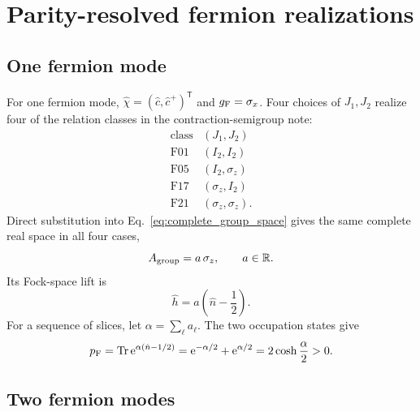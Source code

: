 \documentclass[onecolumn,aps,prb,amsmath,amssymb,superscriptaddress,longbibliography]{revtex4-2}
\newcommand{\Tr}{\operatorname{Tr}}
\newcommand{\ee}{\mathrm{e}}
\newcommand{\trans}{\mathsf{T}}
\begin{document}
\section{Parity-resolved fermion realizations}

\subsection{One fermion mode}

For one fermion mode,
\(\hat\chi=(\hat c,\hat c^+)^\trans\) and \(g_{\rm F}=\sigma_x\).
Four choices of \(J_1,J_2\) realize four of the relation classes in the
contraction-semigroup note:
\begin{equation}
\begin{array}{c|c}
\text{class} & (J_1,J_2) \\ \hline
\mathrm{F01} & (I_2,I_2)\\
\mathrm{F05} & (I_2,\sigma_z)\\
\mathrm{F17} & (\sigma_z,I_2)\\
\mathrm{F21} & (\sigma_z,\sigma_z).
\end{array}
    \label{eq:one_mode_realizations}
\end{equation}
Direct substitution into Eq.~\eqref{eq:complete_group_space} gives the same
complete real space in all four cases,
\begin{equation}
    A_{\rm group}=a\,\sigma_z,\qquad a\in\mathbb R .
    \label{eq:one_mode_group}
\end{equation}
Its Fock-space lift is
\begin{equation}
    \hat h=a\left(\hat n-\frac12\right).
    \label{eq:one_mode_fermion_generator}
\end{equation}
For a sequence of slices, let \(\alpha=\sum_\ell a_\ell\).  The two occupation
states give
\begin{equation}
    p_{\rm F}
    =\Tr\ee^{\alpha(\hat n-1/2)}
    =\ee^{-\alpha/2}+\ee^{\alpha/2}
    =2\cosh\frac{\alpha}{2}>0 .
    \label{eq:one_mode_fermion_weight}
\end{equation}

\subsection{Two fermion modes}
\end{document}

